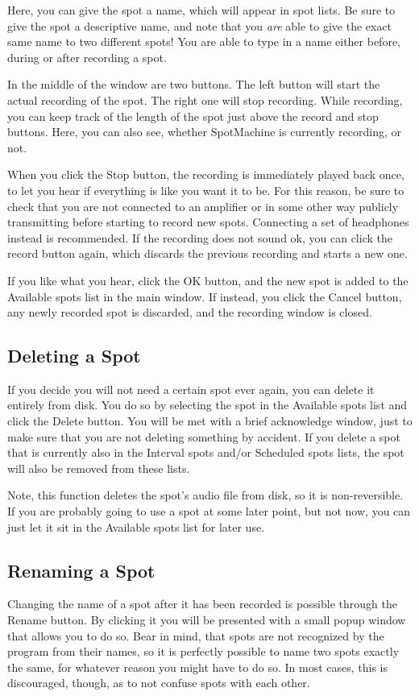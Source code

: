 \documentclass[a4paper,12pt]{report}
\begin{document}
Here, you can give the spot a name, which will appear in spot lists. Be sure to give the spot a descriptive name, and note that you {\em are} able to give the exact same name to two different spots! You are able to type in a name either before, during or after recording a spot.

In the middle of the window are two buttons. The left button will start the actual recording of the spot. The right one will stop recording. While recording, you can keep track of the length of the spot just above the record and stop buttons. Here, you can also see, whether SpotMachine is currently recording, or not.

When you click the Stop button, the recording is immediately played back once, to let you hear if everything is like you want it to be. For this reason, be sure to check that you are not connected to an amplifier or in some other way publicly transmitting before starting to record new spots. Connecting a set of headphones instead is recommended. If the recording does not sound ok, you can click the record button again, which discards the previous recording and starts a new one.

If you like what you hear, click the OK button, and the new spot is added to the Available spots list in the main window. If instead, you click the Cancel button, any newly recorded spot is discarded, and the recording window is closed.

\subsection{Deleting a Spot}
If you decide you will not need a certain spot ever again, you can delete it entirely from disk. You do so by selecting the spot in the Available spots list and click the Delete button. You will be met with a brief acknowledge window, just to make sure that you are not deleting something by accident. If you delete a spot that is currently also in the Interval spots and/or Scheduled spots lists, the spot will also be removed from these lists.

Note, this function deletes the spot's audio file from disk, so it is non-reversible. If you are probably going to use a spot at some later point, but not now, you can just let it sit in the Available spots list for later use.

\subsection{Renaming a Spot}
Changing the name of a spot after it has been recorded is possible through the Rename button. By clicking it you will be presented with a small popup window that allows you to do so. Bear in mind, that spots are not recognized by the program from their names, so it is perfectly possible to name two spots exactly the same, for whatever reason you might have to do so. In most cases, this is discouraged, though, as to not confuse spots with each other.
\end{document}
